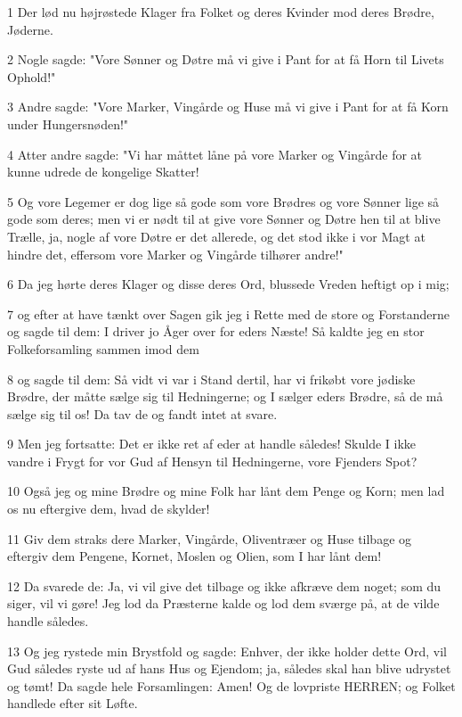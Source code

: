 \par 1 Der lød nu højrøstede Klager fra Folket og deres Kvinder mod deres Brødre, Jøderne.
\par 2 Nogle sagde: "Vore Sønner og Døtre må vi give i Pant for at få Horn til Livets Ophold!"
\par 3 Andre sagde: "Vore Marker, Vingårde og Huse må vi give i Pant for at få Korn under Hungersnøden!"
\par 4 Atter andre sagde: "Vi har måttet låne på vore Marker og Vingårde for at kunne udrede de kongelige Skatter!
\par 5 Og vore Legemer er dog lige så gode som vore Brødres og vore Sønner lige så gode som deres; men vi er nødt til at give vore Sønner og Døtre hen til at blive Trælle, ja, nogle af vore Døtre er det allerede, og det stod ikke i vor Magt at hindre det, effersom vore Marker og Vingårde tilhører andre!"
\par 6 Da jeg hørte deres Klager og disse deres Ord, blussede Vreden heftigt op i mig;
\par 7 og efter at have tænkt over Sagen gik jeg i Rette med de store og Forstanderne og sagde til dem: I driver jo Åger over for eders Næste! Så kaldte jeg en stor Folkeforsamling sammen imod dem
\par 8 og sagde til dem: Så vidt vi var i Stand dertil, har vi frikøbt vore jødiske Brødre, der måtte sælge sig til Hedningerne; og I sælger eders Brødre, så de må sælge sig til os! Da tav de og fandt intet at svare.
\par 9 Men jeg fortsatte: Det er ikke ret af eder at handle således! Skulde I ikke vandre i Frygt for vor Gud af Hensyn til Hedningerne, vore Fjenders Spot?
\par 10 Også jeg og mine Brødre og mine Folk har lånt dem Penge og Korn; men lad os nu eftergive dem, hvad de skylder!
\par 11 Giv dem straks dere Marker, Vingårde, Oliventræer og Huse tilbage og eftergiv dem Pengene, Kornet, Moslen og Olien, som I har lånt dem!
\par 12 Da svarede de: Ja, vi vil give det tilbage og ikke afkræve dem noget; som du siger, vil vi gøre! Jeg lod da Præsterne kalde og lod dem sværge på, at de vilde handle således.
\par 13 Og jeg rystede min Brystfold og sagde: Enhver, der ikke holder dette Ord, vil Gud således ryste ud af hans Hus og Ejendom; ja, således skal han blive udrystet og tømt! Da sagde hele Forsamlingen: Amen! Og de lovpriste HERREN; og Folket handlede efter sit Løfte.
